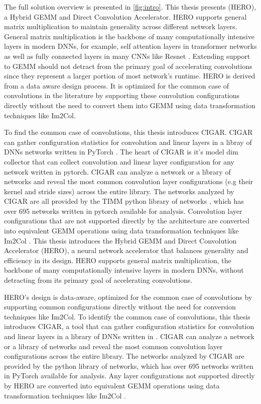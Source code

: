 The full solution overview is presented in \autoref{fig:intro}. This thesis
presents (HERO), a Hybrid GEMM and Direct Convolution Accelerator.  
HERO supports general matrix multiplication to maintain generality across
different network layers. General matrix multiplication is the backbone of many
computationally intensive layers in modern DNNs, for example, self attention
layers in transformer networks \cite{transformer_model} as well as fully
connected layers in many CNNs like Resnet \cite{resnet}. Extending support to
GEMM should not detract from the primary goal of accelerating convolutions since
they represent a larger portion of most network's runtime.  
HERO is derived from a data aware design process. It is optimized for the common
case of convolutions in the literature by supporting these convolution
configurations directly without the need to convert them into GEMM using data
transformation techniques like Im2Col.


To find the common case of convolutions,
this thesis introduces \ac{CIGAR}. CIGAR can gather configuration statistics for
convolution and linear layers in a libray of DNNs networks written in PyTorch
\cite{pytorch}. The heart of CIGAR is it's model dim collector that can collect
convolution and linear layer configuration for any network written in pytorch.
CIGAR can analyze a network or a library of networks and reveal the most common
convolution layer configurations (e.g their kernel and stride sizes) across the
entire library. The networks analyzed by CIGAR are all provided by the \ac{TIMM}
python library of networks \cite{timm}, which has over 695 networks written in
pytorch available for analysis. Convolution layer configurations that are not
supported directly by the architecture are converted into equivalent GEMM
operations using data transformation techniques like Im2Col
\cite{cafe_con_troll}. 
This thesis introduces the Hybrid GEMM and Direct Convolution Accelerator
(HERO), a neural network accelerator that balances generality and efficiency in
its design. HERO supports general matrix multiplication, the backbone of many
computationally intensive layers in modern DNNs, without detracting from its
primary goal of accelerating convolutions.

HERO's design is data-aware, optimized for the common case of convolutions by
supporting common configurations directly without the need for conversion
techniques like Im2Col. To identify the common case of convolutions, this thesis
introduces CIGAR, a tool that can gather configuration statistics for
convolution and linear layers in a library of DNNs written in \cite{pytorch}. CIGAR can
analyze a network or a library of networks and reveal the most common
convolution layer configurations across the entire library. The networks
analyzed by CIGAR are provided by the \cite{timm} python library of networks, which has
over 695 networks written in PyTorch available for analysis. Any layer configurations
not supported directly by HERO are converted into equivalent GEMM operations
using data transformation techniques like Im2Col
\cite{cafe_con_troll}.


